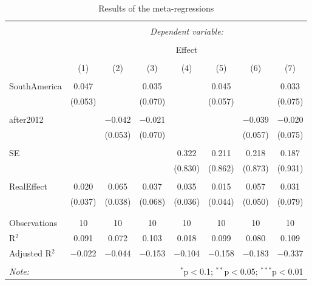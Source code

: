 \documentclass[a4paper, 10pt]{article}
\begin{document}
\begin{table}[!htbp] \centering 
  \caption{Results of the meta-regressions} 
  \label{tab:metaregs} 
\begin{tabular}{@{\extracolsep{5pt}}lccccccc} 
\\[-1.8ex]\hline 
\hline \\[-1.8ex] 
 & \multicolumn{7}{c}{\textit{Dependent variable:}} \\ 
\cline{2-8} 
\\[-1.8ex] & \multicolumn{7}{c}{Effect} \\ 
\\[-1.8ex] & (1) & (2) & (3) & (4) & (5) & (6) & (7)\\ 
\hline \\[-1.8ex] 
 SouthAmerica & 0.047 &  & 0.035 &  & 0.045 &  & 0.033 \\ 
  & (0.053) &  & (0.070) &  & (0.057) &  & (0.075) \\ 
  & & & & & & & \\ 
 after2012 &  & $-$0.042 & $-$0.021 &  &  & $-$0.039 & $-$0.020 \\ 
  &  & (0.053) & (0.070) &  &  & (0.057) & (0.075) \\ 
  & & & & & & & \\ 
 SE &  &  &  & 0.322 & 0.211 & 0.218 & 0.187 \\ 
  &  &  &  & (0.830) & (0.862) & (0.873) & (0.931) \\ 
  & & & & & & & \\ 
 RealEffect & 0.020 & 0.065 & 0.037 & 0.035 & 0.015 & 0.057 & 0.031 \\ 
  & (0.037) & (0.038) & (0.068) & (0.036) & (0.044) & (0.050) & (0.079) \\ 
  & & & & & & & \\ 
\hline \\[-1.8ex] 
Observations & 10 & 10 & 10 & 10 & 10 & 10 & 10 \\ 
R$^{2}$ & 0.091 & 0.072 & 0.103 & 0.018 & 0.099 & 0.080 & 0.109 \\ 
Adjusted R$^{2}$ & $-$0.022 & $-$0.044 & $-$0.153 & $-$0.104 & $-$0.158 & $-$0.183 & $-$0.337 \\ 
\hline 
\hline \\[-1.8ex] 
\textit{Note:}  & \multicolumn{7}{r}{$^{*}$p$<$0.1; $^{**}$p$<$0.05; $^{***}$p$<$0.01} \\ 
\end{tabular}
\end{table}

\end{document}
